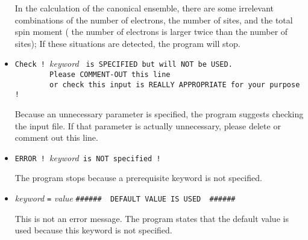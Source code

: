 \begin{itemize}
In the calculation of the canonical ensemble, 
there are some irrelevant combinations of the number of electrons, the number of sites, and the total spin moment
( the number of electrons is larger twice than the number of sites);
If these situations are detected, the program will stop.

\item \verb|Check ! |\textit{keyword} \verb| is SPECIFIED but will NOT be USED.|\\
      \verb|        Please COMMENT-OUT this line|\\
      \verb|        or check this input is REALLY APPROPRIATE for your purpose !|

Because an unnecessary parameter is specified, the program suggests checking the input file.
If that parameter is actually unnecessary, please delete or comment out this line.

\item \verb|ERROR ! |\textit{keyword}\verb| is NOT specified !|

The program stops because a prerequisite keyword is not specified.

\item \textit{keyword} \verb|=| \textit{value} \verb|######  DEFAULT VALUE IS USED  ######|

This is not an error message.
The program states that the default value is used because this keyword is not specified.

\end{itemize}
